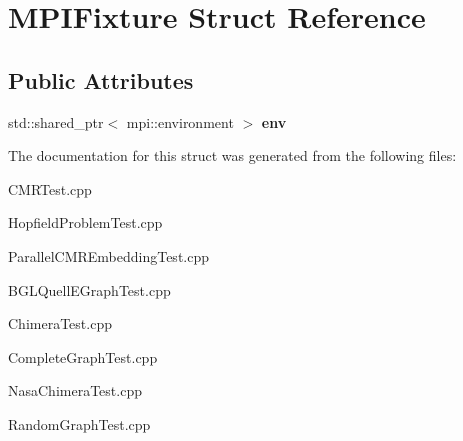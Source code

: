 \hypertarget{a00087}{}\section{M\+P\+I\+Fixture Struct Reference}
\label{a00087}
\subsection*{Public Attributes}
\begin{DoxyCompactItemize}
\item 
std\+::shared\+\_\+ptr$<$ mpi\+::environment $>$ {\bfseries env}\hypertarget{a00087_ababa6710359cb4d3da33b33aab8eafab}{}\label{a00087_ababa6710359cb4d3da33b33aab8eafab}

\end{DoxyCompactItemize}


The documentation for this struct was generated from the following files\+:\begin{DoxyCompactItemize}
\item 
C\+M\+R\+Test.\+cpp\item 
Hopfield\+Problem\+Test.\+cpp\item 
Parallel\+C\+M\+R\+Embedding\+Test.\+cpp\item 
B\+G\+L\+Quell\+E\+Graph\+Test.\+cpp\item 
Chimera\+Test.\+cpp\item 
Complete\+Graph\+Test.\+cpp\item 
Nasa\+Chimera\+Test.\+cpp\item 
Random\+Graph\+Test.\+cpp\end{DoxyCompactItemize}
